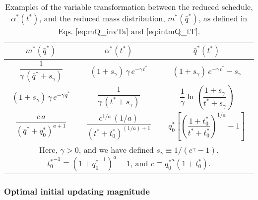 \documentclass[preprint, superscriptaddress, floatfix]{revtex4-1}
\begin{document}
\begin{table}[h]
  \caption{\label{tab:m_and_a}
    Examples of the variable transformation between the
    reduced schedule, $\alpha^*(t^*)$,
    and the reduced mass distribution, $m^*(\bar q^*)$,
    as defined in Eqs. \eqref{eq:mQ_invTa}
    and \eqref{eq:intmQ_tT}.
  }
  \setlength{\tabcolsep}{2pt} %
  \renewcommand\arraystretch{2.0} %
  \begin{tabular} { c c c }
    \hline
    $m^*(\bar q^*)$ &
    $\alpha^*(t^*)$ &
    $\bar q^*(t^*)$
    \\
    \hline
    $\dfrac{1}{\gamma \, ({\bar q}^* + s_\gamma) }$ &
    $(1 + s_\gamma) \, \gamma \, e^{-\gamma \, t^*}$ &
    $(1 + s_\gamma) \, e^{-\gamma \, t^*} - s_\gamma$
    \\
    $(1+ s_\gamma) \, \gamma \, e^{-\gamma \, {\bar q}^*}$ &
    $\dfrac{1}{ \gamma \, (t^* + s_\gamma) }$ &
    $\dfrac{1}{\gamma} \ln\left(\dfrac{1 + s_\gamma}{t^* + s_\gamma} \right)$
    \\
    $\dfrac{c \, a}{\left( {\bar q}^* + q^*_0 \right)^{a+1}}$ &
    $\dfrac{c^{1/a} \, (1/a)}{\left( t^* + t^*_0 \right)^{(1/a)+1}}$ &
    $q^*_0 \left[\left( \dfrac{1+t^*_0}{t^* + t^*_0} \right)^{1/a} - 1\right]$
    \\
    \hline
    \multicolumn{3}{p{8cm}}{
    Here,
    $\gamma > 0$,
    and we have defined
    $s_\gamma \equiv 1/(e^\gamma - 1)$,
    ${t^*_0}^{-1} \equiv \left(1+{q^*_0}^{-1}\right)^a - 1$,
    and
    $c \equiv {q^*_0}^a(1 + t^*_0)$.
    } \\
    \hline
  \end{tabular}
\end{table}








\subsubsection{\label{sec:optinitalpha}
  Optimal initial updating magnitude
}
\end{document}
